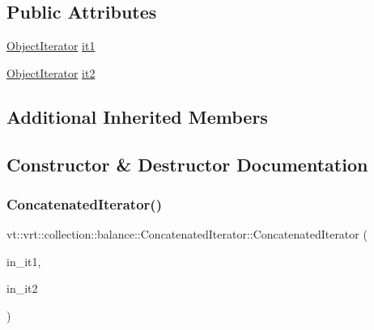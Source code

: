 \subsection*{Public Attributes}
\begin{DoxyCompactItemize}
\item 
\hyperlink{structvt_1_1vrt_1_1collection_1_1balance_1_1_object_iterator}{Object\+Iterator} \hyperlink{structvt_1_1vrt_1_1collection_1_1balance_1_1_concatenated_iterator_aee45a94631e680103b90c565053ff798}{it1}
\item 
\hyperlink{structvt_1_1vrt_1_1collection_1_1balance_1_1_object_iterator}{Object\+Iterator} \hyperlink{structvt_1_1vrt_1_1collection_1_1balance_1_1_concatenated_iterator_af2563b4159d20a1d75acb9dc31c06107}{it2}
\end{DoxyCompactItemize}
\subsection*{Additional Inherited Members}


\subsection{Constructor \& Destructor Documentation}
\mbox{\label{structvt_1_1vrt_1_1collection_1_1balance_1_1_concatenated_iterator_a69257d76a55b73fc572196e01665d6d5}} 
\subsubsection{\texorpdfstring{Concatenated\+Iterator()}{ConcatenatedIterator()}}
{\footnotesize\ttfamily vt\+::vrt\+::collection\+::balance\+::\+Concatenated\+Iterator\+::\+Concatenated\+Iterator (\begin{DoxyParamCaption}\item[{\hyperlink{structvt_1_1vrt_1_1collection_1_1balance_1_1_object_iterator}{Object\+Iterator} \&\&}]{in\+\_\+it1,  }\item[{\hyperlink{structvt_1_1vrt_1_1collection_1_1balance_1_1_object_iterator}{Object\+Iterator} \&\&}]{in\+\_\+it2 }\end{DoxyParamCaption})\hspace{0.3cm}{\ttfamily [inline]}}



